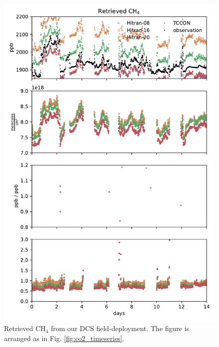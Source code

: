 \documentclass[amt, manuscript]{copernicus}
\begin{document}
\begin{figure}
  \centering
  \includegraphics{ch4_timeseries.pdf}
  \caption{Retrieved CH$_4$ from our DCS field-deployment. The figure is arranged as in Fig. \ref{fig:co2_timeseries}.}
  \label{fig:ch4_timeseries}
\end{figure}
\end{document}
